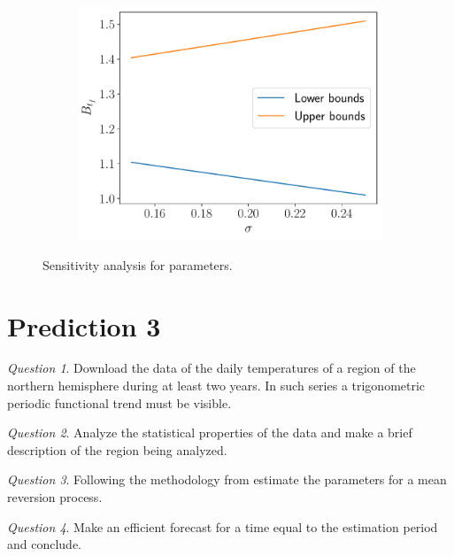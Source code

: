 \documentclass[11pt]{article}
\theoremstyle{definition}
\theoremstyle{remark}
\theoremstyle{remark}
\newtheorem{question}{Question}
\begin{document}
\begin{figure}
\begin{subfigure}[b]{0.45\textwidth}
  \end{subfigure}
  \begin{subfigure}[b]{0.45\textwidth}
      \centering
      \includegraphics[scale=0.45]{sigma_sens}
      \caption{}
  \end{subfigure}
  \caption{Sensitivity analysis for parameters.}
  \label{fig:anal2}
\end{figure}

\section*{Prediction 3}
\begin{question}
  Download the data of the daily temperatures of a region of the
  northern hemisphere during at least two years. In such series a
  trigonometric periodic functional trend must be visible.
\end{question}

\begin{question}
  Analyze the statistical properties of the data and make a brief
  description of the region being analyzed.
\end{question}

\begin{question}
  Following the methodology from \parencite{alaton2002} estimate the
  parameters for a mean reversion process.
\end{question}

\begin{question}
  Make an efficient forecast for a time equal to the estimation
  period and conclude.
\end{question}
\end{document}
